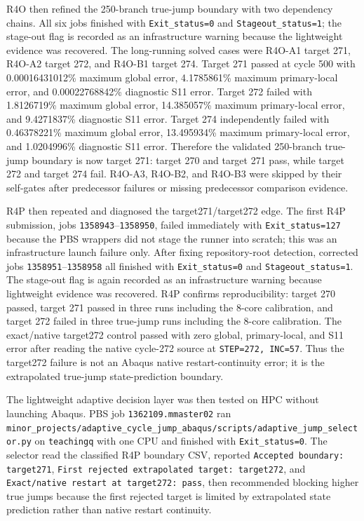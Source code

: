 \documentclass{article}
\begin{document}
R4O then refined the 250-branch true-jump boundary with two dependency chains. All six jobs finished with \texttt{Exit\_status=0} and \texttt{Stageout\_status=1}; the stage-out flag is recorded as an infrastructure warning because the lightweight evidence was recovered. The long-running solved cases were R4O-A1 target 271, R4O-A2 target 272, and R4O-B1 target 274. Target 271 passed at cycle 500 with 0.00016431012\% maximum global error, 4.1785861\% maximum primary-local error, and 0.00022768842\% diagnostic S11 error. Target 272 failed with 1.8126719\% maximum global error, 14.385057\% maximum primary-local error, and 9.4271837\% diagnostic S11 error. Target 274 independently failed with 0.46378221\% maximum global error, 13.495934\% maximum primary-local error, and 1.0204996\% diagnostic S11 error. Therefore the validated 250-branch true-jump boundary is now target 271: target 270 and target 271 pass, while target 272 and target 274 fail. R4O-A3, R4O-B2, and R4O-B3 were skipped by their self-gates after predecessor failures or missing predecessor comparison evidence.

R4P then repeated and diagnosed the target271/target272 edge. The first R4P submission, jobs \texttt{1358943}--\texttt{1358950}, failed immediately with \texttt{Exit\_status=127} because the PBS wrappers did not stage the runner into scratch; this was an infrastructure launch failure only. After fixing repository-root detection, corrected jobs \texttt{1358951}--\texttt{1358958} all finished with \texttt{Exit\_status=0} and \texttt{Stageout\_status=1}. The stage-out flag is again recorded as an infrastructure warning because lightweight evidence was recovered. R4P confirms reproducibility: target 270 passed, target 271 passed in three runs including the 8-core calibration, and target 272 failed in three true-jump runs including the 8-core calibration. The exact/native target272 control passed with zero global, primary-local, and S11 error after reading the native cycle-272 source at \texttt{STEP=272, INC=57}. Thus the target272 failure is not an Abaqus native restart-continuity error; it is the extrapolated true-jump state-prediction boundary.

The lightweight adaptive decision layer was then tested on HPC without launching Abaqus. PBS job \texttt{1362109.mmaster02} ran \texttt{minor\_projects/adaptive\_cycle\_jump\_abaqus/scripts/adaptive\_jump\_selector.py} on \texttt{teachingq} with one CPU and finished with \texttt{Exit\_status=0}. The selector read the classified R4P boundary CSV, reported \texttt{Accepted boundary: target271}, \texttt{First rejected extrapolated target: target272}, and \texttt{Exact/native restart at target272: pass}, then recommended blocking higher true jumps because the first rejected target is limited by extrapolated state prediction rather than native restart continuity.
\end{document}
